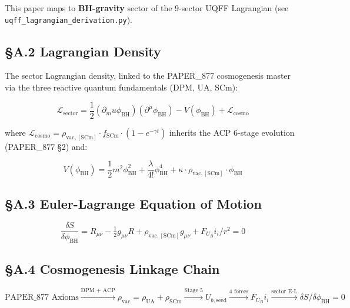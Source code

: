\documentclass[12pt,a4paper]{article}
\begin{document}
This paper maps to \textbf{BH-gravity} sector of the 9-sector UQFF Lagrangian (see \texttt{uqff\_{lagrangian\_derivation}.py}).

\subsection{\S{}A.2 Lagrangian Density}

The sector Lagrangian density, linked to the PAPER\_877 cosmogenesis master via the three reactive quantum fundamentals (DPM, UA, SCm):

\begin{equation}
\mathcal{L}_{\mathrm{sector}} = \frac{1}{2}(\partial_mu \phi_{\mathrm{BH}})(\partial^\mu \phi_{\mathrm{BH}}) - V(\phi_{\mathrm{BH}}) + \mathcal{L}_{\mathrm{cosmo}}
\end{equation}

where $\mathcal{L}_{\mathrm{cosmo}} = \rho_{\mathrm{vac,[SCm]}} \cdot f_{\mathrm{SCm}} \cdot (1 - e^{-\gamma t})$ inherits the ACP 6-stage evolution (PAPER\_877 \S{}2) and:

\begin{equation}
V(\phi_{\mathrm{BH}}) = \frac{1}{2} m^2 \phi_{\mathrm{BH}}^2 + \frac{\lambda}{4!} \phi_{\mathrm{BH}}^4 + \kappa \cdot \rho_{\mathrm{vac,[SCm]}} \cdot \phi_{\mathrm{BH}}
\end{equation}

\subsection{\S{}A.3 Euler-Lagrange Equation of Motion}

\begin{equation}
\boxed{\frac{\delta S}{\delta \phi_{\mathrm{BH}}} = R_{\mu\nu} - \tfrac{1}{2}g_{\mu\nu}R + \rho_{\mathrm{vac,[SCm]}} g_{\mu\nu} + F_U_Bi_i/r^2 = 0}
\end{equation}

\subsection{\S{}A.4 Cosmogenesis Linkage Chain}

\begin{equation}
\text{PAPER\_877 Axioms} \xrightarrow{\text{DPM + ACP}} \rho_{\mathrm{vac}} = \rho_{\mathrm{UA}} + \rho_{\mathrm{SCm}} \xrightarrow{\text{Stage 5}} U_{b,\mathrm{seed}} \xrightarrow{\text{4 forces}} F_U_Bi_i \xrightarrow{\text{sector E-L}} \delta S/\delta \phi_{\mathrm{BH}} = 0
\end{equation}
\end{document}
